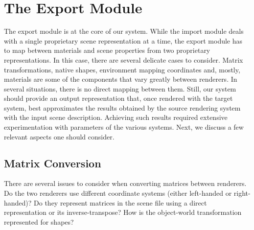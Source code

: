 



\section{The Export Module}

The export module is at the core of our system. While the import module deals with a single proprietary scene representation at a time, the export module has to map between materials and scene properties from two proprietary representations. 
In this case, there are several delicate cases to
consider. Matrix transformations, native shapes, environment mapping coordinates and, mostly, materials are
some of the components that vary greatly between renderers. 
In several situations, there is no direct mapping between them. Still, our system should provide an output representation that, once rendered with the target system, best approximates the results obtained by the source rendering system with the input scene description. 
Achieving such results required extensive experimentation with parameters of the various systems. Next, we discuss a few relevant aspects one should consider.    
  
\subsection{Matrix Conversion}
There are several issues to consider when converting matrices between renderers.
Do the two renderers use different coordinate systems (either left-handed or right-handed)? 
Do they represent matrices in the scene file using a direct representation or its
inverse-transpose? How is the object-world transformation represented for
shapes?

